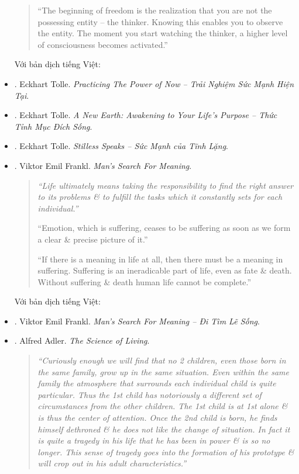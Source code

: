 \documentclass[12pt]{article}
\begin{document}
\begin{itemize}
\begin{quotation}
		``The beginning of freedom is the realization that you are not the possessing entity -- the thinker. Knowing this enables you to observe the entity. The moment you start watching the thinker, a higher level of consciousness becomes activated.''
	\end{quotation}
	Với bản dịch tiếng Việt:
	\item \cite{Tolle_practice_now_VN}. {\sc Eckhart Tolle}. {\it Practicing The Power of Now -- Trải Nghiệm Sức Mạnh Hiện Tại}.
	\item \cite{Tolle_earth_VN}. {\sc Eckhart Tolle}. {\it A New Earth: Awakening to Your Life's Purpose -- Thức Tỉnh Mục Đích Sống}.
	\item \cite{Tolle_stillness_VN}. {\sc Eckhart Tolle}. {\it Stilless Speaks -- Sức Mạnh của Tĩnh Lặng}.
	\item \cite{Frankl_meaning,Frankl_meaning_revised}. {\sc Viktor Emil Frankl}. {\it Man's Search For Meaning}.
	\begin{quotation}\it
		``Life ultimately means taking the responsibility to find the right answer to its problems \& to fulfill the tasks which it constantly sets for each individual.''
		
		``Emotion, which is suffering, ceases to be suffering as soon as we form a clear \& precise picture of it.''
		
		``If there is a meaning in life at all, then there must be a meaning in suffering. Suffering is an ineradicable part of life, even as fate \& death. Without suffering \& death human life cannot be complete.''
	\end{quotation}
	Với bản dịch tiếng Việt:
	\item \cite{Frankl_meaning_VN}. {\sc Viktor Emil Frankl}. {\it Man's Search For Meaning -- Đi Tìm Lẽ Sống}.
	\item \cite{Adler2013}. {\sc Alfred Adler}. {\it The Science of Living}.
	\begin{quotation}\it
		``Curiously enough we will find that no 2 children, even those born in the same family, grow up in the same situation. Even within the same family the atmosphere that surrounds each individual child is quite particular. Thus the 1st child has notoriously a different set of circumstances from the other children. The 1st child is at 1st alone \& is thus the center of attention. Once the 2nd child is born, he finds himself dethroned \& he does not like the change of situation. In fact it is quite a tragedy in his life that he has been in power \& is so no longer. This sense of tragedy goes into the formation of his prototype \& will crop out in his adult characteristics.''
		

\end{quotation}
\end{itemize}
\end{document}
